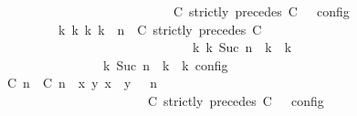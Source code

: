 \begin{isabellebody}
\ \ \ \ \ \ \ \ \ \ \ \ \ \ \ \ \ \ \ \ \ \ \ \ \ \ \ \ {\isasymturnstile}\ {\isasymPsi}\ {\isasymtriangleright}\ {\isacharparenleft}{\isacharparenleft}C\ strictly\ precedes\ C\ {\isacharhash}\ {\isasymPhi}{\isacharparenright}\ {\isasymrbrakk}\isactrlsub c\isactrlsub o\isactrlsub n\isactrlsub f\isactrlsub i\isactrlsub g\isanewline
\ \ \ \ \ \ \ \ \ \ \ \ {\isasymLongrightarrow}\ {\isacharparenleft}{\isasymexists}{\isasymGamma}\isactrlsub k\ {\isasymPsi}\isactrlsub k\ {\isasymPhi}\isactrlsub k\ k{\isachardot}\ {\isacharparenleft}{\isacharparenleft}{\isasymGamma}{\isacharcomma}\ n\ {\isasymturnstile}\ {\isacharparenleft}{\isacharparenleft}C\ strictly\ precedes\ C\ {\isacharhash}\ {\isasymPsi}{\isacharparenright}\ {\isasymtriangleright}\ {\isasymPhi}{\isacharparenright}\isanewline
\ \ \ \ \ \ \ \ \ \ \ \ \ \ \ \ \ \ \ \ \ \ \ \ \ \ \ \ \ \ \ \ \ \ {\isasymhookrightarrow}\isactrlbsup k\isactrlesup \ {\isacharparenleft}{\isasymGamma}\isactrlsub k{\isacharcomma}\ Suc\ n\ {\isasymturnstile}\ {\isasymPsi}\isactrlsub k\ {\isasymtriangleright}\ {\isasymPhi}\isactrlsub k{\isacharparenright}{\isacharparenright}\isanewline
\ \ \ \ \ \ \ \ \ \ \ \ \ \ \ \ {\isasymand}\ {\isacharparenleft}{\isasymrho}\ {\isasymin}\ {\isasymlbrakk}\ {\isasymGamma}\isactrlsub k{\isacharcomma}\ Suc\ n\ {\isasymturnstile}\ {\isasymPsi}\isactrlsub k\ {\isasymtriangleright}\ {\isasymPhi}\isactrlsub k\ {\isasymrbrakk}\isactrlsub c\isactrlsub o\isactrlsub n\isactrlsub f\isactrlsub i\isactrlsub g{\isacharparenright}{\isacharparenright}{\isacartoucheclose}\isanewline
\ \ \ \ \ \ \isamarkupfalse%
\ {\isacharminus}\isanewline
\ \ \ \ \ \ \ \ \isamarkupfalse%
\ {\isacartoucheopen}{\isasymrho}\ {\isasymin}\ {\isasymlbrakk}\ {\isacharparenleft}{\isacharparenleft}{\isasymlceil}{\isacharhash}\isactrlsup {\isasymle}\ C\ n{\isacharcomma}\ {\isacharhash}\isactrlsup {\isacharless}\ C\ n{\isasymrceil}\ {\isasymin}\ {\isacharparenleft}{\isasymlambda}{\isacharparenleft}x{\isacharcomma}\ y{\isacharparenright}{\isachardot}\ x\ {\isasymle}\ y{\isacharparenright}{\isacharparenright}\ {\isacharhash}\ {\isasymGamma}{\isacharparenright}{\isacharcomma}\ n\isanewline
\ \ \ \ \ \ \ \ \ \ \ \ \ \ \ \ \ \ \ \ \ \ \ \ {\isasymturnstile}\ {\isasymPsi}\ {\isasymtriangleright}\ {\isacharparenleft}{\isacharparenleft}C\ strictly\ precedes\ C\ {\isacharhash}\ {\isasymPhi}{\isacharparenright}\ {\isasymrbrakk}\isactrlsub c\isactrlsub o\isactrlsub n\isactrlsub f\isactrlsub i\isactrlsub g{\isacartoucheclose}\isanewline

\end{isabellebody}
